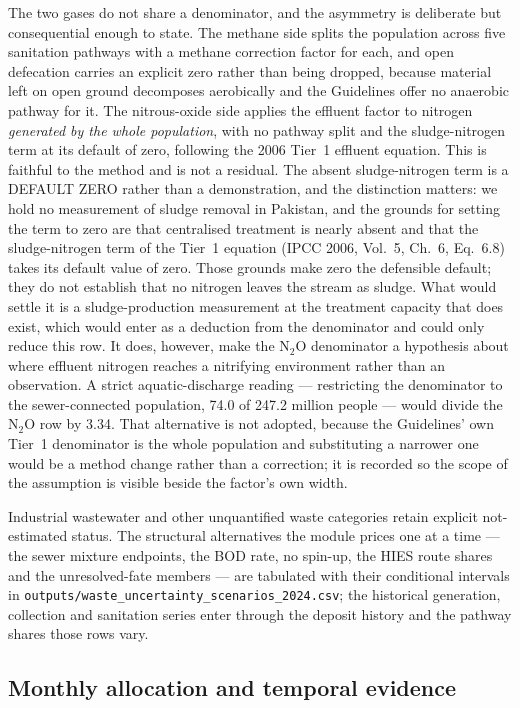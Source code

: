 \documentclass[essd]{copernicus}
\begin{document}
The two gases do not share a denominator, and the asymmetry is deliberate but consequential enough to state. The methane side splits the population across five sanitation pathways with a methane correction factor for each, and open defecation carries an explicit zero rather than being dropped, because material left on open ground decomposes aerobically and the Guidelines offer no anaerobic pathway for it. The nitrous-oxide side applies the effluent factor to nitrogen \emph{generated by the whole population}, with no pathway split and the sludge-nitrogen term at its default of zero, following the 2006 Tier~1 effluent equation. This is faithful to the method and is not a residual. The absent sludge-nitrogen term is a DEFAULT ZERO rather than a demonstration, and the distinction matters: we hold no measurement of sludge removal in Pakistan, and the grounds for setting the term to zero are that centralised treatment is nearly absent and that the sludge-nitrogen term of the Tier~1 equation (IPCC 2006, Vol.~5, Ch.~6, Eq.~6.8) takes its default value of zero. Those grounds make zero the defensible default; they do not establish that no nitrogen leaves the stream as sludge. What would settle it is a sludge-production measurement at the treatment capacity that does exist, which would enter as a deduction from the denominator and could only reduce this row. It does, however, make the N$_2$O denominator a hypothesis about where effluent nitrogen reaches a nitrifying environment rather than an observation. A strict aquatic-discharge reading --- restricting the denominator to the sewer-connected population, \SI{74.0}{} of \SI{247.2}{} million people --- would divide the N$_2$O row by \num{3.34}. That alternative is not adopted, because the Guidelines' own Tier~1 denominator is the whole population and substituting a narrower one would be a method change rather than a correction; it is recorded so the scope of the assumption is visible beside the factor's own width.

Industrial wastewater and other unquantified waste categories retain explicit not-estimated status. The structural alternatives the module prices one at a time --- the sewer mixture endpoints, the BOD rate, no spin-up, the HIES route shares and the unresolved-fate members --- are tabulated with their conditional intervals in \texttt{outputs/waste\_uncertainty\_scenarios\_2024.csv}; the historical generation, collection and sanitation series enter through the deposit history and the pathway shares those rows vary.


\subsection{Monthly allocation and temporal evidence}
\label{sec:temporal}
\end{document}
